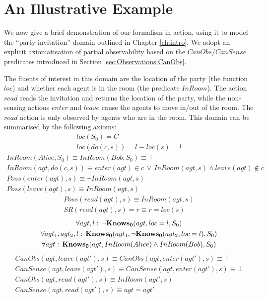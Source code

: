 \section{An Illustrative Example\label{sec:Knowledge:Example}}

We now give a brief demonstration of our formalism in action, using
it to model the {}``party invitation'' domain outlined in Chapter
\ref{ch:intro}. We adopt an explicit axiomatisation of partial observability
based on the $CanObs$/$CanSense$ predicates introduced in Section
\ref{sec:Observations:CanObs}.

The fluents of interest in this domain are the location of the party
(the function $loc$) and whether each agent is in the room (the predicate
$InRoom$). The action $read$ reads the invitation and returns the
location of the party, while the non-sensing actions $enter$ and
$leave$ cause the agents to move in/out of the room. The $read$
action is only observed by agents who are in the room. This domain
can be summarised by the following axioms:\begin{gather*}
loc(S_{0})=C\\
loc(do(c,s))=l\equiv loc(s)=l\end{gather*}
 \begin{gather*}
InRoom(Alice,S_{0})\equiv InRoom(Bob,S_{0})\equiv\top\\
InRoom(agt,do(c,s))\equiv enter(agt)\in c\,\vee\, InRoom(agt,s)\wedge leave(agt)\notin c\\
Poss(enter(agt),s)\equiv\neg InRoom(agt,s)\\
Poss(leave(agt),s)\equiv InRoom(agt,s)\end{gather*}
 \begin{gather*}
Poss(read(agt),s)\equiv InRoom(agt,s)\\
SR(read(agt),s)=r\equiv r=loc(s)\end{gather*}
 \begin{gather*}
\forall agt,l:\,\neg\mathbf{Knows_{0}}(agt,loc=l,S_{0})\\
\forall agt_{1},agt_{2},l:\,\mathbf{Knows_{0}}(agt_{1},\neg\mathbf{Knows_{0}}(agt_{2},loc=l),S_{0})\\
\forall agt:\,\mathbf{Knows_{0}}(agt,InRoom(Alice)\wedge InRoom(Bob),S_{0})\end{gather*}
 \begin{gather*}
CanObs(agt,leave(agt'),s)\equiv CanObs(agt,enter(agt'),s)\equiv\top\\
CanSense(agt,leave(agt'),s)\equiv CanSense(agt,enter(agt'),s)\equiv\bot\\
CanObs(agt,read(agt'),s)\equiv InRoom(agt',s)\\
CanSense(agt,read(agt'),s)\equiv agt=agt'\end{gather*}



